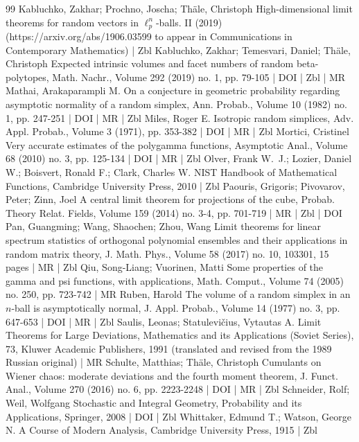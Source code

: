 \documentclass[10pt]{amsart}
\theoremstyle{definition}\newtheorem{defi}[theo]{Definition}\newtheorem{rema}[theo]{Remark}\newtheorem{exam}[theo]{Example}\newtheorem{exem}[theo]{Example}\newtheorem{nota}[theo]{Notation}
\begin{document}
\begin{thebibliography}{99}
Kabluchko, Zakhar; Prochno, Joscha; Thäle, Christoph High-dimensional limit theorems for random vectors in $\ell _p^n$-balls. II (2019) (https://arxiv.org/abs/1906.03599 to appear in Communications in Contemporary Mathematics) | Zbl
Kabluchko, Zakhar; Temesvari, Daniel; Thäle, Christoph Expected intrinsic volumes and facet numbers of random beta-polytopes, Math. Nachr., Volume 292 (2019) no. 1, pp. 79-105 | DOI | Zbl | MR
Mathai, Arakaparampli M. On a conjecture in geometric probability regarding asymptotic normality of a random simplex, Ann. Probab., Volume 10 (1982) no. 1, pp. 247-251 | DOI | MR | Zbl
Miles, Roger E. Isotropic random simplices, Adv. Appl. Probab., Volume 3 (1971), pp. 353-382 | DOI | MR | Zbl
Mortici, Cristinel Very accurate estimates of the polygamma functions, Asymptotic Anal., Volume 68 (2010) no. 3, pp. 125-134 | DOI | MR | Zbl
Olver, Frank W. J.; Lozier, Daniel W.; Boisvert, Ronald F.; Clark, Charles W. NIST Handbook of Mathematical Functions, Cambridge University Press, 2010 | Zbl
Paouris, Grigoris; Pivovarov, Peter; Zinn, Joel A central limit theorem for projections of the cube, Probab. Theory Relat. Fields, Volume 159 (2014) no. 3-4, pp. 701-719 | MR | Zbl | DOI
Pan, Guangming; Wang, Shaochen; Zhou, Wang Limit theorems for linear spectrum statistics of orthogonal polynomial ensembles and their applications in random matrix theory, J. Math. Phys., Volume 58 (2017) no. 10, 103301, 15 pages | MR | Zbl
Qiu, Song-Liang; Vuorinen, Matti Some properties of the gamma and psi functions, with applications, Math. Comput., Volume 74 (2005) no. 250, pp. 723-742 | MR
Ruben, Harold The volume of a random simplex in an $n$-ball is asymptotically normal, J. Appl. Probab., Volume 14 (1977) no. 3, pp. 647-653 | DOI | MR | Zbl
Saulis, Leonas; Statulevičius, Vytautas A. Limit Theorems for Large Deviations, Mathematics and its Applications (Soviet Series), 73, Kluwer Academic Publishers, 1991 (translated and revised from the 1989 Russian original) | MR
Schulte, Matthias; Thäle, Christoph Cumulants on Wiener chaos: moderate deviations and the fourth moment theorem, J. Funct. Anal., Volume 270 (2016) no. 6, pp. 2223-2248 | DOI | MR | Zbl
Schneider, Rolf; Weil, Wolfgang Stochastic and Integral Geometry, Probability and its Applications, Springer, 2008 | DOI | Zbl
Whittaker, Edmund T.; Watson, George N. A Course of Modern Analysis, Cambridge University Press, 1915 | Zbl
\end{thebibliography}
\end{document}
